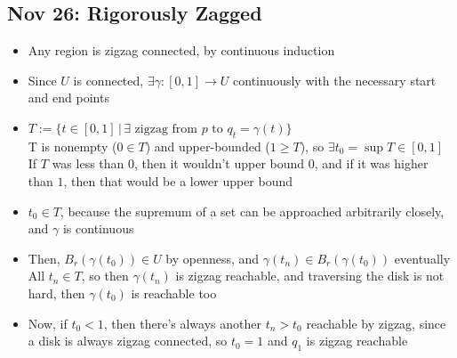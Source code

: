 \documentclass[10pt, oneside]{article}
\let\geq\geqslant
\begin{document}
\subsection{Nov 26: Rigorously Zagged}
\begin{itemize}
    \item Any region is zigzag connected, by continuous induction
    \item Since $U$ is connected, $\exists \gamma : [0,1] \rightarrow U$ continuously with the necessary start and end points
    \item $T := \{t \in [0,1]\,|\,\exists \text{ zigzag from } p \text{ to }  q_t = \gamma(t)\}$\\
    T is nonempty ($0 \in T$) and upper-bounded ($1 \geq T$), so $\exists t_0 = \sup T \in [0,1]$\\
    If $T$ was less than 0, then it wouldn't upper bound $0$, and if it was higher than $1$, then that would be a lower upper bound
    \item $t_0 \in T$, because the supremum of a set can be approached arbitrarily closely, and $\gamma$ is continuous
    \item Then, $B_r(\gamma(t_0)) \in U$ by openness, and $\gamma(t_n) \in B_r(\gamma(t_0))$ eventually\\
    All $t_n \in T$, so then $\gamma(t_n)$ is zigzag reachable, and traversing the disk is not hard, then $\gamma(t_0)$ is reachable too
    \item Now, if $t_0 < 1$, then there's always another $t_n > t_0$ reachable by zigzag, since a disk is always zigzag connected, so $t_0 = 1$ and $q_1$ is zigzag reachable
\end{itemize}
\end{document}

